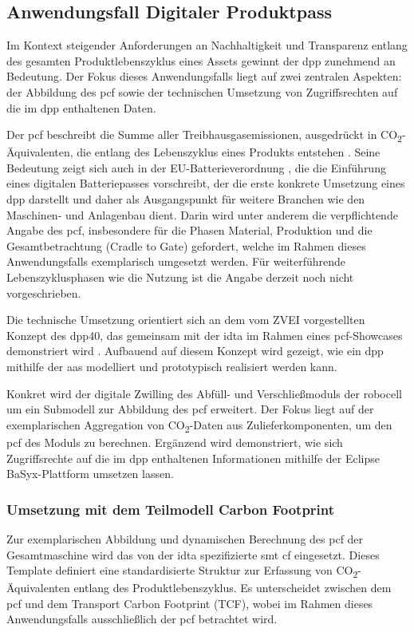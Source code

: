 \newpage
\subsection{Anwendungsfall Digitaler Produktpass}
Im Kontext steigender Anforderungen an Nachhaltigkeit und Transparenz entlang des gesamten Produktlebenszyklus eines Assets gewinnt der \acs{dpp} zunehmend an Bedeutung. 
Der Fokus dieses Anwendungsfalls liegt auf zwei zentralen Aspekten: der Abbildung des \acs{pcf} sowie der technischen Umsetzung von Zugriffsrechten auf die im \acs{dpp} enthaltenen Daten.

Der \acs{pcf} beschreibt die Summe aller Treibhausgasemissionen, ausgedrückt in CO\textsubscript{2}-Äquivalenten, die entlang des Lebenszyklus eines Produkts entstehen \cite{PCF}. 
Seine Bedeutung zeigt sich auch in der EU-Batterieverordnung \cite{EUVerordnung}, die die Einführung eines digitalen Batteriepasses vorschreibt, der die erste konkrete Umsetzung eines \acs{dpp} darstellt und daher als Ausgangspunkt für weitere Branchen wie den Maschinen- und Anlagenbau dient.
Darin wird unter anderem die verpflichtende Angabe des \acs{pcf}, insbesondere für die Phasen Material, Produktion und die Gesamtbetrachtung (Cradle to Gate) gefordert, welche im Rahmen dieses Anwendungsfalls exemplarisch umgesetzt werden. 
Für weiterführende Lebenszyklusphasen wie die Nutzung ist die Angabe derzeit noch nicht vorgeschrieben.

Die technische Umsetzung orientiert sich an dem vom ZVEI vorgestellten Konzept des \acs{dpp40}, das gemeinsam mit der \acs{idta} im Rahmen eines \acs{pcf}-Showcases demonstriert wird \cite{PCFShowcas}. 
Aufbauend auf diesem Konzept wird gezeigt, wie ein \acs{dpp} mithilfe der \acs{aas} modelliert und prototypisch realisiert werden kann.

Konkret wird der digitale Zwilling des Abfüll- und Verschließmoduls der robocell um ein Submodell zur Abbildung des \acs{pcf} erweitert. 
Der Fokus liegt auf der exemplarischen Aggregation von CO\textsubscript{2}-Daten aus Zulieferkomponenten, um den \acs{pcf} des Moduls zu berechnen. 
Ergänzend wird demonstriert, wie sich Zugriffsrechte auf die im \acs{dpp} enthaltenen Informationen mithilfe der Eclipse BaSyx-Plattform umsetzen lassen.

\subsubsection{Umsetzung mit dem Teilmodell Carbon Footprint}
Zur exemplarischen Abbildung und dynamischen Berechnung des \acs{pcf} der Gesamtmaschine wird das von der \acs{idta} spezifizierte \acs{smt} \acs{cf} \cite{SpezifikaitonPCF} eingesetzt.  
Dieses Template definiert eine standardisierte Struktur zur Erfassung von CO\textsubscript{2}-Äquivalenten entlang des Produktlebenszyklus.  
Es unterscheidet zwischen dem \acs{pcf} und dem Transport Carbon Footprint (TCF), wobei im Rahmen dieses Anwendungsfalls ausschließlich der \acs{pcf} betrachtet wird.

